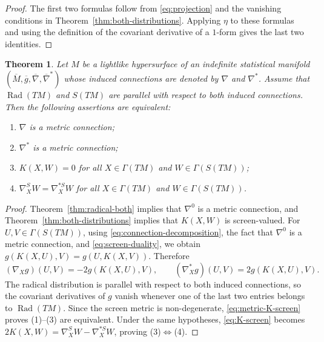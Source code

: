 \documentclass[11pt,a4paper]{article}
\newtheorem{theorem}{Theorem}[section]
\theoremstyle{remark}
\theoremstyle{definition}
\newcommand{\Rad}{\operatorname{Rad}}
\begin{document}
\begin{proof}
The first two formulas follow from \eqref{eq:projection} and the
vanishing conditions in Theorem~\ref{thm:both-distributions}. Applying
$\eta$ to these formulas and using the definition of the covariant derivative
of a $1$-form gives the last two identities.
\end{proof}

\begin{theorem}\label{thm:metric-connections}
Let $M$ be a lightlike hypersurface of an indefinite statistical manifold
$(\overline{M},\overline{g},\overline{\nabla},\overline{\nabla}^{*})$
whose induced connections are denoted by $\nabla$ and $\nabla^{*}$.
Assume that $\Rad(TM)$ and $S(TM)$ are parallel with respect to both
induced connections. Then the following assertions are equivalent:
\begin{enumerate}
\item $\nabla$ is a metric connection;
\item $\nabla^{*}$ is a metric connection;
\item $K(X,W)=0$ for all $X\in\Gamma(TM)$ and
$W\in\Gamma(S(TM))$;
\item $\nabla_X^{S}W=\nabla_X^{*S}W$ for all
$X\in\Gamma(TM)$ and $W\in\Gamma(S(TM))$.
\end{enumerate}
\end{theorem}

\begin{proof}
Theorem~\ref{thm:radical-both} implies that $\nabla^{0}$ is a metric
connection, and Theorem~\ref{thm:both-distributions} implies that
$K(X,W)$ is screen-valued. For $U,V\in\Gamma(S(TM))$, using
\eqref{eq:connection-decomposition}, the fact that $\nabla^{0}$ is a metric
connection, and \eqref{eq:screen-duality}, we obtain
$g(K(X,U),V)=g(U,K(X,V))$. Therefore
\begin{equation}\label{eq:metric-K-screen}
(\nabla_Xg)(U,V)=-2g(K(X,U),V),
\qquad
(\nabla_X^{*}g)(U,V)=2g(K(X,U),V).
\end{equation}
The radical distribution is parallel with respect to both induced
connections, so the covariant derivatives of $g$ vanish whenever one of
the last two entries belongs to $\Rad(TM)$. Since the screen metric is
non-degenerate, \eqref{eq:metric-K-screen} proves (1)--(3) are
equivalent. Under the same hypotheses, \eqref{eq:K-screen} becomes
$2K(X,W)=\nabla_X^{S}W-\nabla_X^{*S}W$, proving
(3)$\Leftrightarrow$(4).
\end{proof}
\end{document}
